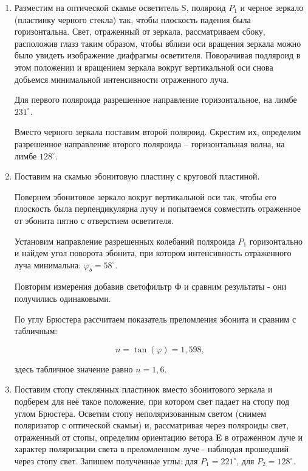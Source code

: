 \documentclass[a4paper, 12pt]{article}%
\begin{document}
\begin{enumerate}

\item Разместим на оптической скамье осветитель S, поляроид $P_1$ и черное зеркало (пластинку черного стекла) так, чтобы плоскость падения была горизонтальна. Свет, отраженный от зеркала, рассматриваем сбоку, расположив глазз таким образом, чтобы вблизи оси вращения зеркала можно было увидеть изображение диафрагмы осветителя. Поворачивая подляроид в этом положении и вращением зеркала вокруг вертикальной оси снова добьемся минимальной интенсивности отраженного луча.

Для первого поляроида разрешенное направление горизонтальное, на лимбе $231^{\circ}$.

Вместо черного зеркала поставим второй поляроид. Скрестим их, определим разрешенное направление второго поляроида -- горизонтальная волна, на лимбе $128^{\circ}$.

\item Поставим на скамью эбонитовую пластину с круговой пластиной.

Повернем эбонитовое зеркало вокруг вертикальной оси так, чтобы его плоскость была перпендикулярна лучу и попытаемся совместить отраженное от эбонита пятно с отверстием осветителя.

Установим направление разрешенных колебаний поляроида $P_1$ горизонтально и найдем угол поворота эбонита, при котором интенсивность отраженного луча минимальна: $\varphi_b = 58^{\circ}.$

Повторим измерения добавив светофильтр Ф и сравним результаты - они получились одинаковыми.

По углу Брюстера рассчитаем показатель преломления эбонита и сравним с табличным:

\[n = \tan (\varphi) = 1,598,\]

здесь табличное значение равно $n = 1,6$.

\item Поставим стопу стеклянных пластинок вместо эбонитового зеркала и подберем для неё такое положение, при котором свет падает на стопу под углом Брюстера. Осветим стопу неполяризованным светом (снимем поляризатор с оптической скамьи) и, рассматривая через поляроиды свет, отраженный от стопы, определим ориентацию ветора \textbf{E} в отраженном луче и характер поляризации света в преломленном луче - наблюдая прошедший через стопу свет. Запишем полученные углы: для $P_1 = 221^{\circ}$, для $P_2 = 128^{\circ}$.


\end{enumerate}
\end{document}
